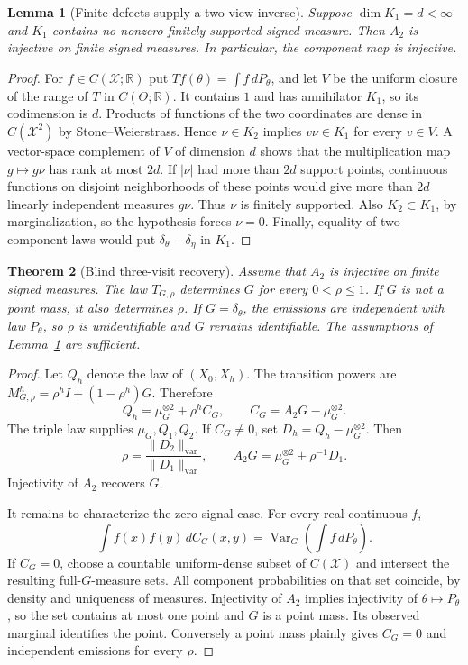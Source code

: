 \documentclass[11pt,a4paper]{article}
\newtheorem{theorem}{Theorem}[section]
\newtheorem{lemma}[theorem]{Lemma}
\theoremstyle{definition}
\theoremstyle{remark}
\numberwithin{equation}{section}
\begin{document}
\begin{lemma}[Finite defects supply a two-view inverse]\label{p1:lem:stat-defect}
Suppose $\dim K_1=d<\infty$ and $K_1$ contains no nonzero finitely supported
signed measure.  Then $A_2$ is injective on finite signed measures.  In
particular, the component map is injective.
\end{lemma}
\begin{proof}
For $f\in C(\mathcal X;\mathbb R)$ put
$Tf(\theta)=\int f\,dP_\theta$, and let $V$ be the uniform closure of the
range of $T$ in $C(\Theta;\mathbb R)$.  It contains $1$ and has annihilator
$K_1$, so its codimension is $d$.  Products of functions of the two
coordinates are dense in $C(\mathcal X^2)$ by Stone--Weierstrass.  Hence
$\nu\in K_2$ implies $v\nu\in K_1$ for every $v\in V$.  A vector-space
complement of $V$ of dimension $d$ shows that the multiplication map
$g\mapsto g\nu$ has rank at most $2d$.  If $|\nu|$ had more than $2d$
support points, continuous functions on disjoint neighborhoods of these
points would give more than $2d$ linearly independent measures $g\nu$.
Thus $\nu$ is finitely supported.  Also $K_2\subset K_1$, by marginalization,
so the hypothesis forces $\nu=0$.  Finally, equality of two component laws
would put $\delta_\theta-\delta_\eta$ in $K_1$.
\end{proof}

\begin{theorem}[Blind three-visit recovery]\label{p1:thm:stat-three-visits}
Assume that $A_2$ is injective on finite signed measures.  The law
$T_{G,\rho}$ determines $G$ for every $0<\rho\le1$.  If $G$ is not a point
mass, it also determines $\rho$.  If $G=\delta_\theta$, the emissions are
independent with law $P_\theta$, so $\rho$ is unidentifiable and $G$ remains
identifiable.  The assumptions of Lemma~\ref{p1:lem:stat-defect} are sufficient.
\end{theorem}
\begin{proof}
Let $Q_h$ denote the law of $(X_0,X_h)$.  The transition powers are
$M_{G,\rho}^h=\rho^h I+(1-\rho^h)G$.  Therefore
\begin{equation}\label{p1:eq:stat-lag-identities}
 Q_h=\mu_G^{\otimes2}+\rho^h C_G,
 \qquad C_G=A_2G-\mu_G^{\otimes2}.
\end{equation}
The triple law supplies $\mu_G,Q_1,Q_2$.  If $C_G\ne0$, set
$D_h=Q_h-\mu_G^{\otimes2}$.  Then
\[
 \rho=\frac{\|D_2\|_{\mathrm{var}}}{\|D_1\|_{\mathrm{var}}},
 \qquad A_2G=\mu_G^{\otimes2}+\rho^{-1}D_1.
\]
Injectivity of $A_2$ recovers $G$.

It remains to characterize the zero-signal case.  For every real continuous
$f$,
\[
 \int f(x)f(y)\,dC_G(x,y)
   =\operatorname{Var}_G\!\left(\int f\,dP_\theta\right).
\]
If $C_G=0$, choose a countable uniform-dense subset of $C(\mathcal X)$ and
intersect the resulting full-$G$-measure sets.  All component probabilities
on that set coincide, by density and uniqueness of measures.  Injectivity
of $A_2$ implies injectivity of $\theta\mapsto P_\theta$, so the set contains
at most one point and $G$ is a point mass.  Its observed marginal identifies
the point.  Conversely a point mass plainly gives $C_G=0$ and independent
emissions for every $\rho$.
\end{proof}
\end{document}
